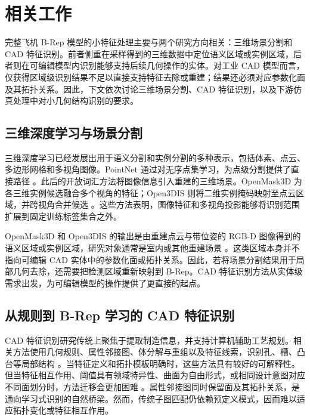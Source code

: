 \documentclass[12pt,a4paper]{ctexart}
\begin{document}
\section{相关工作}\label{sec2}

完整飞机 B-Rep 模型的小特征处理主要与两个研究方向相关：三维场景分割和 CAD 特征识别。前者侧重在采样得到的三维数据中定位语义区域或实例区域，后者则在可编辑模型内识别能够支持后续几何操作的实体。对工业 CAD 模型而言，仅获得区域级识别结果不足以直接支持特征去除或重建；结果还必须对应参数化面及其拓扑关系。因此，下文依次讨论三维场景分割、CAD 特征识别，以及下游仿真处理中对小几何结构识别的要求。

\subsection{三维深度学习与场景分割}

三维深度学习已经发展出用于语义分割和实例分割的多种表示，包括体素、点云、多边形网格和多视角图像。PointNet 通过对无序点集学习，为点级分割提供了直接路径 \parencite{qi2017pointnet}。此后的开放词汇方法将图像信息引入重建的三维场景。OpenMask3D 为各三维实例候选融合多个视角的特征；Open3DIS 则将二维实例掩码映射至点云区域，并跨视角合并候选 \parencite{takmaz2023openmask3d,nguyen2024open3dis}。这些方法表明，图像特征和多视角投影能够将识别范围扩展到固定训练标签集合之外。

OpenMask3D 和 Open3DIS 的输出是由重建点云与带位姿的 RGB-D 图像得到的语义区域或实例区域，研究对象通常是室内或其他重建场景 \parencite{takmaz2023openmask3d,nguyen2024open3dis}。这类区域本身并不指向可编辑 CAD 实体中的参数化面或拓扑关系。因此，若将场景分割结果用于局部几何去除，还需要把检测区域重新映射到 B-Rep。CAD 特征识别方法从实体级需求出发，为可编辑模型的操作提供了更直接的起点。

\subsection{从规则到 B-Rep 学习的 CAD 特征识别}

CAD 特征识别研究传统上聚焦于提取制造信息，并支持计算机辅助工艺规划。相关方法使用几何规则、属性邻接图、体分解与重组以及特征线索，识别孔、槽、凸台等局部结构 \parencite{han2000manufacturing,shah2001discourse,babic2008review}。当特征定义和拓扑模板明确时，这些方法具有较好的可解释性。但当特征相互作用、阈值具有领域特异性、曲面为自由形式，或相同设计意图对应不同面划分时，方法迁移会更加困难 \parencite{shah2001discourse}。属性邻接图同时保留面及其拓扑关系，是通向学习式识别的自然桥梁。然而，传统子图匹配仍依赖预定义模式，因而难以适应拓扑变化或特征相互作用。
\end{document}
